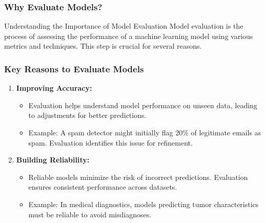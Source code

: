 \documentclass[aspectratio=169]{beamer}
\begin{document}
\begin{frame}[fragile]
    \frametitle{Why Evaluate Models?}
    \begin{block}{Understanding the Importance of Model Evaluation}
        Model evaluation is the process of assessing the performance of a machine learning model using various metrics and techniques. This step is crucial for several reasons.
    \end{block}
\end{frame}

\begin{frame}[fragile]
    \frametitle{Key Reasons to Evaluate Models}
    \begin{enumerate}
        \item \textbf{Improving Accuracy:}
            \begin{itemize}
                \item Evaluation helps understand model performance on unseen data, leading to adjustments for better predictions.
                \item Example: A spam detector might initially flag 20\% of legitimate emails as spam. Evaluation identifies this issue for refinement.
            \end{itemize}
        \item \textbf{Building Reliability:}
            \begin{itemize}
                \item Reliable models minimize the risk of incorrect predictions. Evaluation ensures consistent performance across datasets.
                \item Example: In medical diagnostics, models predicting tumor characteristics must be reliable to avoid misdiagnoses.
            \end{itemize}
    \end{enumerate}
\end{frame}
\end{document}
